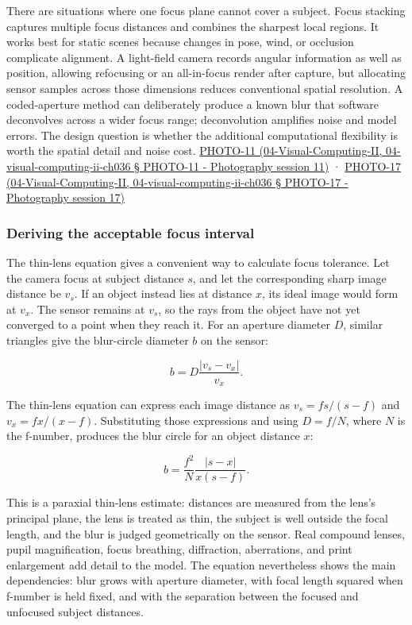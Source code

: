 There are situations where one focus plane cannot cover a subject. Focus stacking captures multiple focus distances and combines the sharpest local regions. It works best for static scenes because changes in pose, wind, or occlusion complicate alignment. A light-field camera records angular information as well as position, allowing refocusing or an all-in-focus render after capture, but allocating sensor samples across those dimensions reduces conventional spatial resolution. A coded-aperture method can deliberately produce a known blur that software deconvolves across a wider focus range; deconvolution amplifies noise and model errors. The design question is whether the additional computational flexibility is worth the spatial detail and noise cost. \href{}{PHOTO-11 (04-Visual-Computing-II, 04-visual-computing-ii-ch036 § PHOTO-11 - Photography session 11)} · \href{}{PHOTO-17 (04-Visual-Computing-II, 04-visual-computing-ii-ch036 § PHOTO-17 - Photography session 17)}

\subsubsection{Deriving the acceptable focus interval}\label{deriving-the-acceptable-focus-interval}

The thin-lens equation gives a convenient way to calculate focus tolerance. Let the camera focus at subject distance \(s\), and let the corresponding sharp image distance be \(v_s\). If an object instead lies at distance \(x\), its ideal image would form at \(v_x\). The sensor remains at \(v_s\), so the rays from the object have not yet converged to a point when they reach it. For an aperture diameter \(D\), similar triangles give the blur-circle diameter \(b\) on the sensor:

\[
b = D\frac{|v_s-v_x|}{v_x}.
\]

The thin-lens equation can express each image distance as \(v_s=fs/(s-f)\) and \(v_x=fx/(x-f)\). Substituting those expressions and using \(D=f/N\), where \(N\) is the f-number, produces the blur circle for an object distance \(x\):

\[
b=\frac{f^2}{N}\frac{|s-x|}{x(s-f)}.
\]

This is a paraxial thin-lens estimate: distances are measured from the lens's principal plane, the lens is treated as thin, the subject is well outside the focal length, and the blur is judged geometrically on the sensor. Real compound lenses, pupil magnification, focus breathing, diffraction, aberrations, and print enlargement add detail to the model. The equation nevertheless shows the main dependencies: blur grows with aperture diameter, with focal length squared when f-number is held fixed, and with the separation between the focused and unfocused subject distances.

